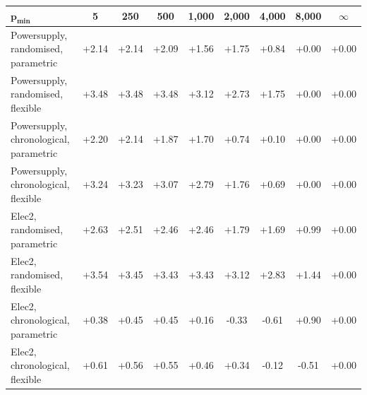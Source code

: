 \begin{tabular}{@{}lcccccccc@{}}
\toprule
$\boldsymbol{p_{\min}}$ & 5 & 250 & 500 & 1,000 & 2,000 & 4,000 & 8,000 & $\infty$\\
\midrule
Powersupply, randomised, parametric & +2.14 & +2.14 & +2.09 & +1.56 & +1.75 & +0.84 & +0.00 & +0.00\\
Powersupply, randomised, flexible & +3.48 & +3.48 & +3.48 & +3.12 & +2.73 & +1.75 & +0.00 & +0.00\\
Powersupply, chronological, parametric & +2.20 & +2.14 & +1.87 & +1.70 & +0.74 & +0.10 & +0.00 & +0.00\\
Powersupply, chronological, flexible & +3.24 & +3.23 & +3.07 & +2.79 & +1.76 & +0.69 & +0.00 & +0.00\\
\midrule
Elec2, randomised, parametric & +2.63 & +2.51 & +2.46 & +2.46 & +1.79 & +1.69 & +0.99 & +0.00\\
Elec2, randomised, flexible & +3.54 & +3.45 & +3.43 & +3.43 & +3.12 & +2.83 & +1.44 & +0.00\\
Elec2, chronological, parametric & +0.38 & +0.45 & +0.45 & +0.16 & -0.33 & -0.61 & +0.90 & +0.00\\
Elec2, chronological, flexible & +0.61 & +0.56 & +0.55 & +0.46 & +0.34 & -0.12 & -0.51 & +0.00\\
\bottomrule
\end{tabular}
